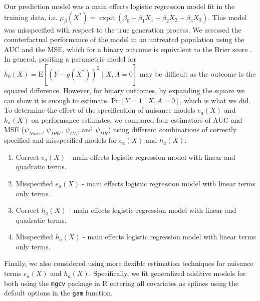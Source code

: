 Our prediction model was a main effects logistic regression model fit in the training data, i.e. $\mu_\beta\left(X^*\right) = \operatorname{expit}(\beta_0 + \beta_1 X_1 + \beta_2 X_2 + \beta_3 X_3)$. This model was misspecified with respect to the true generation process. We assessed the counterfactual performance of the model in an untreated population using the AUC and the MSE, which for a binary outcome is equivalent to the Brier score \cite{brier_verification_1950}. In general, positing a parametric model for $h_0(X)=\mathrm{E}[(Y-g\left(X^*\right))^2 \mid X, A=0]$ may be difficult as the outcome is the squared difference. However, for binary outcomes, by expanding the square we can show it is enough to estimate $\operatorname{Pr}[Y=1 \mid X, A=0]$, which is what we did. To determine the effect of the specification of nuisance models $e_a(X)$ and $h_a(X)$ on performance estimates, we compared four estimators of AUC and MSE (${\psi}_{Naive}$, ${\psi}_{IPW}$, ${\psi}_{CL}$, and ${\psi}_{DR}$) using different combinations of correctly specified and misspecified models for $e_a(X)$ and $h_a(X)$:
\begin{enumerate}
    \item Correct $e_a(X)$ - main effects logistic regression model with linear and quadratic terms.
    \item Misspecified $e_a(X)$ - main effects logistic regression model with linear terms only terms.
    \item Correct $h_a(X)$ - main effects logistic regression model with linear and quadratic terms.
    \item Misspecified $h_a(X)$ - main effects logistic regression model with linear terms only terms.
\end{enumerate}
Finally, we also considered using more flexible estimation techniques for nuisance terms $e_a(X)$ and $h_a(X)$. Specifically, we fit generalized additive models for both using the \texttt{mgcv} package in $\mathrm{R}$ entering all covariates as splines using the default options in the \texttt{gam} function.


